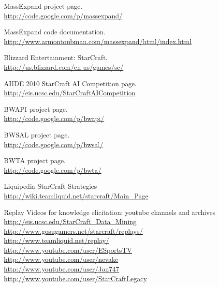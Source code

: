
\nocite{*}

\begin{thebibliography}{99}

	MassExpand project page.\\
	\url{http://code.google.com/p/massexpand/}

	MassExpand code documentation.\\
	\url{http://www.armontoubman.com/massexpand/html/index.html}

	Blizzard Entertainment: StarCraft.\\
	\url{http://us.blizzard.com/en-us/games/sc/}

	AIIDE 2010 StarCraft AI Competition page.\\
	\url{http://eis.ucsc.edu/StarCraftAICompetition}

	BWAPI project page.\\
	\url{http://code.google.com/p/bwapi/}

	BWSAL project page.\\
	\url{http://code.google.com/p/bwsal/}

	BWTA project page.\\
	\url{http://code.google.com/p/bwta/}

	Liquipedia StarCraft Strategies \\
	\url{http://wiki.teamliquid.net/starcraft/Main_Page}

	Replay Videos for knowledge elicitation: youtube channels and archives \\
	\url{http://eis.ucsc.edu/StarCraft_Data_Mining}\\
	\url{http://www.gosugamers.net/starcraft/replays/}\\
	\url{http://www.teamliquid.net/replay/}\\
	\url{http://www.youtube.com/user/ESportsTV}\\
	\url{http://www.youtube.com/user/nevake}\\
	\url{http://www.youtube.com/user/Jon747}\\
	\url{http://www.youtube.com/user/StarCraftLegacy}


\end{thebibliography}